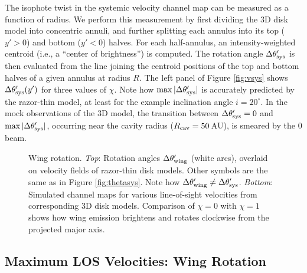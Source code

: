 The isophote twist in the systemic velocity channel map can be measured as a 
function of radius.  We perform this measurement by first dividing the 3D disk 
model into concentric annuli, and further splitting each annulus into its top 
($y'>0$) and bottom ($y'<0$) halves.  For each half-annulus, an 
intensity-weighted centroid (i.e., a ``center of brightness'') is computed.  
The rotation angle $\Delta \theta'_{\rm sys}$ is then evaluated from the line 
joining the centroid positions of the top and bottom halves of a given annulus 
at radius $R$.  The left panel of Figure \ref{fig:vsys} shows $\Delta 
\theta'_{\rm sys} (y')$ for three values of $\chi$.  Note how $\max |\Delta 
\theta'_{\rm sys}|$ is accurately predicted by the razor-thin model, at least 
for the example inclination angle $i = 20^\circ$.  In the mock observations of 
the 3D model, the transition between $\Delta\theta_{\rm sys}'=0$ and $\max 
|\Delta\theta'_{\rm sys}|$, occurring near the cavity radius ($R_{\rm cav} = 
50$\,AU), is smeared by the 0 beam.


\begin{figure}[t!]
\caption{Wing rotation. {\it Top}: Rotation angles $\Delta
\theta'_{\rm wing}$ (white arcs), overlaid on velocity fields of razor-thin 
disk models.  Other symbols are the same as in Figure \ref{fig:thetasys}.  Note 
how $\Delta \theta'_{\rm wing} \neq \Delta \theta'_{\rm sys}$.  {\it Bottom}: 
Simulated channel maps for various line-of-sight velocities from corresponding 
3D disk models.  Comparison of $\chi=0$ with $\chi=1$ shows how wing emission 
brightens and rotates clockwise from the projected major axis. 
\label{fig:thetawing}}
\end{figure}

\subsection{Maximum LOS Velocities: Wing Rotation} \label{subsec:wingrot}

